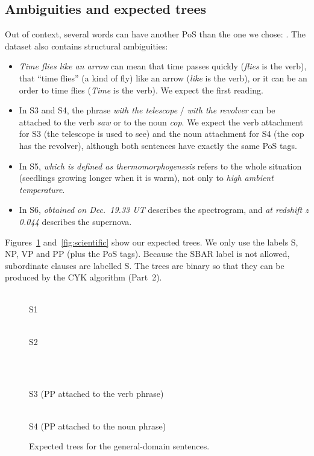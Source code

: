 \documentclass[11pt,a4paper]{article}
\begin{document}
\subsection{Ambiguities and expected trees}
Out of context, several words can have another PoS than the one we chose: \unskip. The dataset also contains structural ambiguities:
\begin{itemize}
  \item \emph{Time flies like an arrow} can mean that time passes quickly (\emph{flies} is the verb), that ``time flies'' (a kind of fly) like an arrow (\emph{like} is the verb), or it can be an order to time flies (\emph{Time} is the verb). We expect the first reading.
  \item In S3 and S4, the phrase \emph{with the telescope} / \emph{with the revolver} can be attached to the verb \emph{saw} or to the noun \emph{cop}. We expect the verb attachment for S3 (the telescope is used to see) and the noun attachment for S4 (the cop has the revolver), although both sentences have exactly the same PoS tags.
  \item In S5, \emph{which is defined as thermomorphogenesis} refers to the whole situation (seedlings growing longer when it is warm), not only to \emph{high ambient temperature}.
  \item In S6, \emph{obtained on Dec.~19.33 UT} describes the spectrogram, and \emph{at redshift z 0.044} describes the supernova.
\end{itemize}
Figures~\ref{fig:general} and~\ref{fig:scientific} show our expected trees. We only use the labels S, NP, VP and PP (plus the PoS tags). Because the SBAR label is not allowed, subordinate clauses are labelled S. The trees are binary so that they can be produced by the CYK algorithm (Part~2).

\begin{figure}[h]\centering
\begin{minipage}[b]{0.45\linewidth}\centering\\\small S1\end{minipage}\hfill
\begin{minipage}[b]{0.45\linewidth}\centering\\\small S2\end{minipage}\\[8pt]
\begin{minipage}[b]{0.49\linewidth}\centering\\\small S3 (PP attached to the verb phrase)\end{minipage}\hfill
\begin{minipage}[b]{0.49\linewidth}\centering\\\small S4 (PP attached to the noun phrase)\end{minipage}
\caption{Expected trees for the general-domain sentences.}\label{fig:general}
\end{figure}
\end{document}
